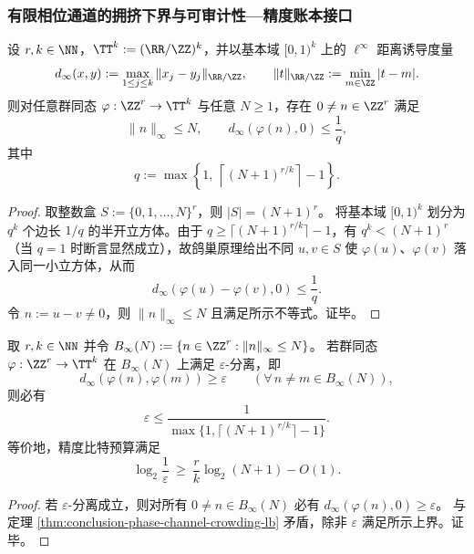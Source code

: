 \subsubsection{有限相位通道的拥挤下界与可审计性—精度账本接口}\label{subsubsec:conclusion-phase-channel-crowding-singlephase-ucdim}

\begin{theorem}\label{thm:conclusion-phase-channel-crowding-lb}
设 \(r,k\in\NN\)，\(\TT^k:=(\RR/\ZZ)^k\)，并以基本域 \([0,1)^k\) 上的 \(\ell^\infty\) 距离诱导度量
\[
d_\infty(x,y):=\max_{1\le j\le k}\|x_j-y_j\|_{\RR/\ZZ},
\qquad
\|t\|_{\RR/\ZZ}:=\min_{m\in\ZZ}|t-m|.
\]
则对任意群同态 \(\varphi:\ZZ^r\to \TT^k\) 与任意 \(N\ge 1\)，存在 \(0\neq n\in\ZZ^r\) 满足
\[
\|n\|_\infty\le N,
\qquad
d_\infty(\varphi(n),0)\le \frac{1}{q},
\]
其中
\[
q:=\max\!\left\{1,\ \left\lceil (N+1)^{r/k}\right\rceil-1\right\}.
\]
\end{theorem}

\begin{proof}
取整数盒
\(
S:=\{0,1,\dots,N\}^r
\)，则 \(|S|=(N+1)^r\)。
将基本域 \([0,1)^k\) 划分为 \(q^k\) 个边长 \(1/q\) 的半开立方体。由于 \(q\ge \lceil (N+1)^{r/k}\rceil-1\)，有 \(q^k<(N+1)^r\)（当 \(q=1\) 时断言显然成立），故鸽巢原理给出不同 \(u,v\in S\) 使 \(\varphi(u)\)、\(\varphi(v)\) 落入同一小立方体，从而
\[
d_\infty(\varphi(u)-\varphi(v),0)\le \frac{1}{q}.
\]
令 \(n:=u-v\neq 0\)，则 \(\|n\|_\infty\le N\) 且满足所示不等式。证毕。
\end{proof}

\begin{corollary}[圆维—精度账本的不可压缩下界]\label{cor:conclusion-cdim-precision-ledger-lb-kphase}
取 \(r,k\in\NN\) 并令 \(B_\infty(N):=\{n\in\ZZ^r:\|n\|_\infty\le N\}\)。
若群同态 \(\varphi:\ZZ^r\to\TT^k\) 在 \(B_\infty(N)\) 上满足 \(\varepsilon\)-分离，即
\[
d_\infty(\varphi(n),\varphi(m))\ge \varepsilon
\qquad
(\forall\,n\neq m\in B_\infty(N)),
\]
则必有
\[
\varepsilon\le \frac{1}{\max\{1,\lceil (N+1)^{r/k}\rceil-1\}}.
\]
等价地，精度比特预算满足
\[
\log_2\frac{1}{\varepsilon}\ \ge\ \frac{r}{k}\log_2(N+1)-O(1).
\]
\end{corollary}

\begin{proof}
若 \(\varepsilon\)-分离成立，则对所有 \(0\neq n\in B_\infty(N)\) 必有 \(d_\infty(\varphi(n),0)\ge \varepsilon\)。
与定理 \ref{thm:conclusion-phase-channel-crowding-lb} 矛盾，除非 \(\varepsilon\) 满足所示上界。证毕。
\end{proof}

